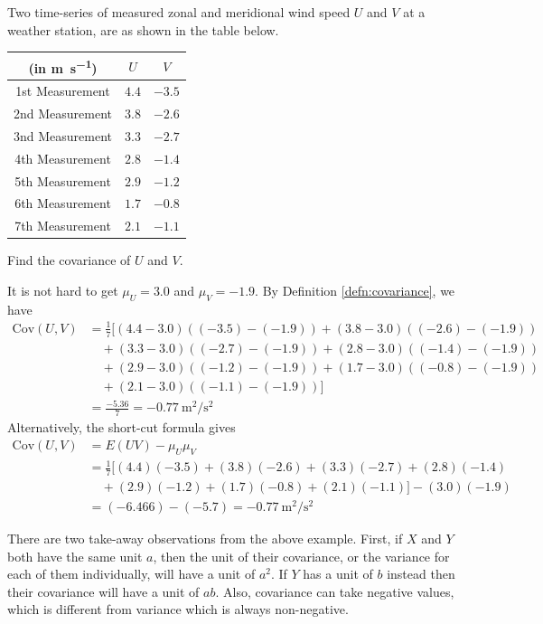 \begin{exmp}
Two time-series of measured zonal and meridional wind speed $U$ and $V$ at a weather station, are as shown in the table below.
\begin{center}
\begin{tabular}{|c|c|c|}
\hline
(in \si{\m \per \s}) & $U$ & $V$\\
\hline
1st Measurement & $4.4$ & $-3.5$ \\
\hline
2nd Measurement & $3.8$ & $-2.6$ \\
\hline
3nd Measurement & $3.3$ & $-2.7$ \\
\hline
4th Measurement & $2.8$ & $-1.4$ \\
\hline
5th Measurement & $2.9$ & $-1.2$ \\
\hline
6th Measurement & $1.7$ & $-0.8$ \\
\hline
7th Measurement & $2.1$ & $-1.1$ \\
\hline
\end{tabular}
\end{center}
Find the covariance of $U$ and $V$.
\end{exmp}
\begin{solution}
It is not hard to get $\mu_U = 3.0$ and $\mu_V = -1.9$. By Definition \ref{defn:covariance}, we have
\begin{align*}
\text{Cov}(U,V) &= \frac{1}{7} [(4.4-3.0)((-3.5)-(-1.9))+(3.8-3.0)((-2.6)-(-1.9)) \\
&\quad+(3.3-3.0)((-2.7)-(-1.9))+(2.8-3.0)((-1.4)-(-1.9)) \\
&\quad+(2.9-3.0)((-1.2)-(-1.9))+(1.7-3.0)((-0.8)-(-1.9)) \\
&\quad+(2.1-3.0)((-1.1)-(-1.9))] \\
&= \frac{-5.36}{7} = \SI{-0.77}{\square\m \per \square\s}
\end{align*}
Alternatively, the short-cut formula gives
\begin{align*}
\text{Cov}(U,V) &= E(UV) - \mu_U \mu_V \\
&= \frac{1}{7}[(4.4)(-3.5) + (3.8)(-2.6) + (3.3)(-2.7) + (2.8)(-1.4) \\
&\quad + (2.9)(-1.2) + (1.7)(-0.8) + (2.1)(-1.1)] - (3.0)(-1.9) \\
&= (-6.466) - (-5.7) = \SI{-0.77}{\square\m \per \square\s}
\end{align*}
\end{solution}
There are two take-away observations from the above example. First, if $X$ and $Y$ both have the same unit $a$, then the unit of their covariance, or the variance for each of them individually, will have a unit of $a^2$. If $Y$ has a unit of $b$ instead then their covariance will have a unit of $ab$. Also, covariance can take negative values, which is different from variance which is always non-negative.\par
